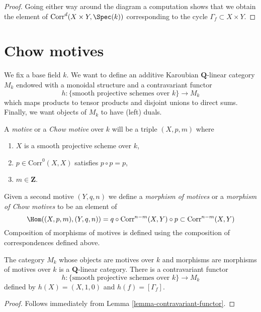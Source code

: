 \begin{proof}
Going either way around the diagram a computation shows that we
obtain the element of $\text{Corr}^d(X \times Y, \Spec(k))$
corresponding to the cycle $\Gamma_f \subset X \times Y$.
\end{proof}







\section{Chow motives}
\label{section-chow-motives}

\noindent
We fix a base field $k$. We want to define an additive
Karoubian $\mathbf{Q}$-linear category $M_k$ endowed
with a monoidal structure and a contravariant functor
$$
h : \{\text{smooth projective schemes over }k\} \longrightarrow M_k
$$
which maps products to tensor products and disjoint unions to direct sums.
Finally, we want objects of $M_k$ to have (left) duals.

\medskip\noindent
A {\it motive} or a {\it Chow motive} over $k$ will be a triple
$(X, p, m)$ where
\begin{enumerate}
\item $X$ is a smooth projective scheme over $k$,
\item $p \in \text{Corr}^0(X, X)$ satisfies $p \circ p = p$,
\item $m \in \mathbf{Z}$.
\end{enumerate}
Given a second motive $(Y, q, n)$ we define a
{\it morphism of motives} or a {\it morphism of Chow motives}
to be an element of
$$
\Hom((X, p, m), (Y, q, n)) =
q \circ \text{Corr}^{n - m}(X, Y) \circ p \subset \text{Corr}^{n - m}(X, Y)
$$
Composition of morphisms of motives is defined using the composition of
correspondences defined above.

\begin{lemma}
\label{lemma-motives}
The category $M_k$ whose objects are motives over $k$ and morphisms
are morphisms of motives over $k$ is a $\mathbf{Q}$-linear category.
There is a contravariant functor
$$
h : \{\text{smooth projective schemes over }k\} \longrightarrow M_k
$$
defined by $h(X) = (X, 1, 0)$ and $h(f) = [\Gamma_f]$.
\end{lemma}

\begin{proof}
Follows immediately from Lemma \ref{lemma-contravariant-functor}.
\end{proof}

